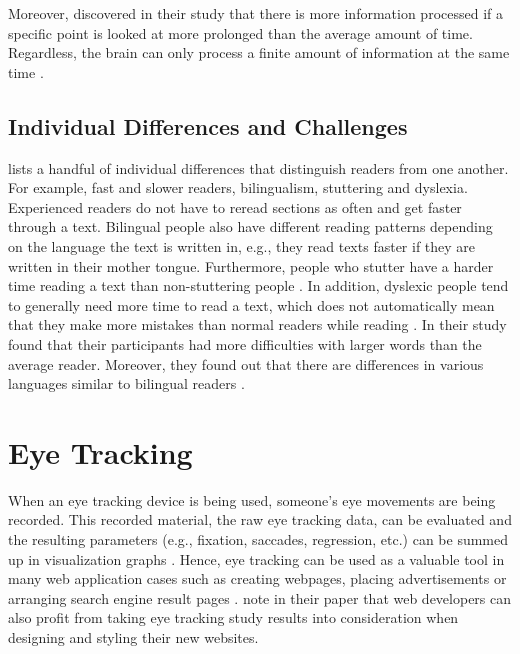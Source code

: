 Moreover, \textcite{buscher2009you} discovered in their study that there is more information processed if a specific point is looked at more prolonged than the average amount of time. Regardless, the brain can only process a finite amount of information at the same time \autocite{biedert2010eyebook}.

\subsection{Individual Differences and Challenges}
\label{subsection:Differences}
\textcite{rayner1998eye} lists a handful of individual differences that distinguish readers from one another. For example, fast and slower readers, bilingualism, stuttering and dyslexia. Experienced readers do not have to reread sections as often and get faster through a text. Bilingual people also have different reading patterns depending on the language the text is written in, e.g., they read texts faster if they are written in their mother tongue. Furthermore, people who stutter have a harder time reading a text than non-stuttering people \autocite{rayner1998eye}. 
In addition, dyslexic people tend to generally need more time to read a text, which does not automatically mean that they make more mistakes than normal readers while reading \autocite{rayner1998eye, hutzler2004eye}.
In their study \textcite{hutzler2004eye} found that their participants had more difficulties with larger words than the average reader.
Moreover, they found out that there are differences in various languages similar to bilingual readers \autocite{hutzler2004eye, rayner1998eye}.

\section{Eye Tracking}
\label{section:EyeTracking}
When an eye tracking device is being used, someone's eye movements are being recorded. This recorded material, the raw eye tracking data, can be evaluated and the resulting parameters (e.g., fixation, saccades, regression, etc.) can be summed up in visualization graphs \autocite[]{goldberg2002eye, poole2006eye, beymer2007eye}. Hence, eye tracking can be used as a valuable tool in many web application cases such as creating webpages, placing advertisements or arranging search engine result pages \autocite{buscher2009you, liu2015influence}. \textcite[]{buscher2009you} note in their paper that web developers can also profit from taking eye tracking study results into consideration when designing and styling their new websites. 

